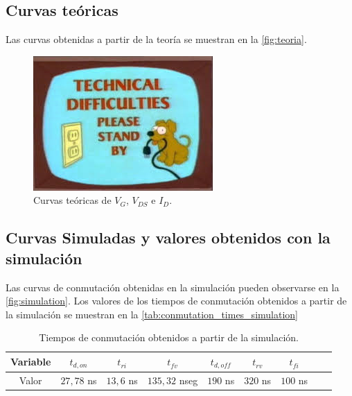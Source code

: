 \documentclass[e4_tp1_main.tex]{subfiles}
\begin{document}
\subsection{Curvas teóricas}
Las curvas obtenidas a partir de la teoría se muestran en la \autoref{fig:teoria}.

\begin{figure}
  \centering
  \includegraphics[width=\linewidth]{images/ej1/curvas_teoria.png}
  \caption{Curvas teóricas de $V_G$, $V_{DS}$ e $I_D$.}
  \label{fig:teoria}
\end{figure}


\subsection{Curvas Simuladas y valores obtenidos con la simulación}
Las curvas de conmutación obtenidas en la simulación pueden observarse en la \autoref{fig:simulation}. Los valores de los tiempos de conmutación obtenidos a partir de la simulación se muestran en la \autoref{tab:conmutation_times_simulation}
\begin{table}[H]
\centering
\begin{tabular}{|c|c|c|c|c|c|c|c|c|}
\hline
Variable & $t_{d,on}$ & $t_{ri}$ & $t_{fv}$ & $t_{d,off}$ & $t_{rv}$ & $t_{fi}$  \\
\hline
Valor & $27,78$ ns & $13,6$ ns & $135,32$ nseg & $190$ ns & $320$ ns & $100$ ns\\
\hline
\end{tabular}	
\caption{Tiempos de conmutación obtenidos a partir de la simulación.}
\label{tab:conmutation_times_simulation}
\end{table}
\end{document}
